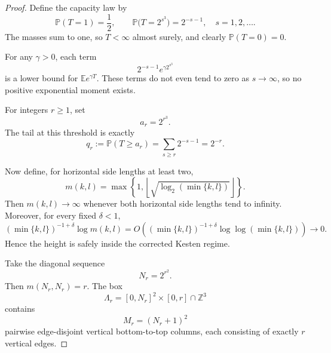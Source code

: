 \documentclass[11pt]{article}
\newcommand{\Pp}{\mathbb P}
\newcommand{\Ee}{\mathbb E}
\begin{document}
\begin{proof}
Define the capacity law by
\begin{equation}
\label{eq:law}
  \Pp(T=1)=\frac12,
  \qquad
  \Pp\bigl(T=2^{s^3}\bigr)=2^{-s-1},\quad s=1,2,\dots.
\end{equation}
The masses sum to one, so \(T<\infty\) almost surely, and clearly \(\Pp(T=0)=0\).

For any \(\gamma>0\), each term
\[
  2^{-s-1}e^{\gamma 2^{s^3}}
\]
is a lower bound for \(\Ee e^{\gamma T}\).  These terms do not even tend to zero as \(s\to\infty\), so no positive exponential moment exists.

For integers \(r\ge1\), set
\begin{equation}
\label{eq:ar}
  a_r=2^{r^3}.
\end{equation}
The tail at this threshold is exactly
\begin{equation}
\label{eq:qr}
  q_r:=\Pp(T\ge a_r)
  =\sum_{s\ge r}2^{-s-1}
  =2^{-r}.
\end{equation}

Now define, for horizontal side lengths at least two,
\begin{equation}
\label{eq:height}
  m(k,l)=\max\left\{1,
    \left\lfloor\sqrt{\log_2(\min\{k,l\})}\right\rfloor
  \right\}.
\end{equation}
Then \(m(k,l)\to\infty\) whenever both horizontal side lengths tend to infinity.  Moreover, for every fixed \(\delta<1\),
\[
  (\min\{k,l\})^{-1+\delta}\log m(k,l)
  =O\!\left((\min\{k,l\})^{-1+\delta}\log\log(\min\{k,l\})\right)
  \longrightarrow0.
\]
Hence the height is safely inside the corrected Kesten regime.

Take the diagonal sequence
\begin{equation}
\label{eq:Nr}
  N_r=2^{r^2}.
\end{equation}
Then \(m(N_r,N_r)=r\).  The box
\[
  \Lambda_r=[0,N_r]^2\times[0,r]\cap\mathbb Z^3
\]
contains
\[
  M_r=(N_r+1)^2
\]
pairwise edge-disjoint vertical bottom-to-top columns, each consisting of exactly \(r\) vertical edges.


\end{proof}
\end{document}
